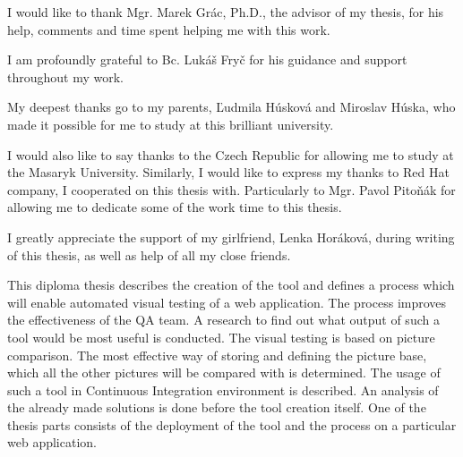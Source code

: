 \documentclass[11pt,oneside,final]{fithesis2}
\begin{document}
\newenvironment{atribut_description}
{\begin{description}
  \renewcommand{\makelabel}[1]{\texttt{\hspace{6pt}##1 $-$}}%
  \setlength{\itemsep}{1pt}
  \setlength{\parskip}{0pt}
  \setlength{\parsep}{0pt}}
{\end{description}}
\renewcommand{\tiny}{\fontsize{7.7}{9.7}\selectfont}

\FrontMatter
\ThesisTitlePage

\begin{ThesisDeclaration}
\DeclarationText
\AdvisorName
\end{ThesisDeclaration}

\begin{ThesisThanks}
I would like to thank Mgr. Marek Grác, Ph.D., the advisor of my thesis, for his help, comments and time spent helping me with this work.

I am profoundly grateful to Bc. Lukáš Fryč for his guidance and support throughout my work.

My deepest thanks go to my parents, Ľudmila Húsková and Miroslav Húska, who made it possible for me to study at this brilliant university. 

I would also like to say thanks to the Czech Republic for allowing me to study at the Masaryk University. Similarly, I would like to express
my thanks to Red Hat company, I cooperated on this thesis with. Particularly to Mgr. Pavol Pitoňák for allowing me to dedicate some of the
work time to this thesis.

I greatly appreciate the support of my girlfriend, Lenka Horáková, during writing of this thesis, as well as help of all my close friends.

\end{ThesisThanks}

\begin{ThesisAbstract}
This diploma thesis describes the creation of the tool and defines a process which will enable automated visual testing of a web application. 
The process improves the effectiveness of the QA team. A research to find out what output of such a tool would be most useful is conducted.
The visual testing is based on picture comparison. The most effective way of storing and defining 
the picture base, which all the other pictures will be compared with is determined. 
The usage of such a tool in Continuous Integration environment is described. 
An analysis of the already made solutions is done before the tool creation itself. 
One of the thesis parts consists of the deployment of the tool and the process on a particular web application.
\end{ThesisAbstract}
 
\end{document}
